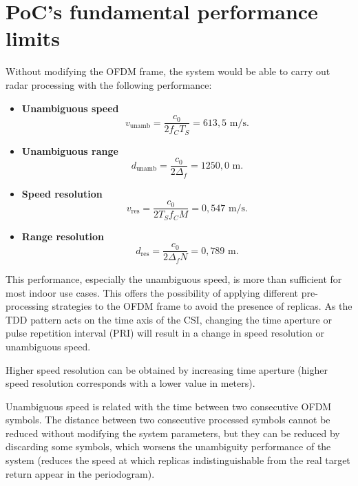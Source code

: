 \section{PoC's fundamental performance limits}

Without modifying the OFDM frame, the system would be able to carry out radar processing with the following performance:

\begin{itemize}
	\item \textbf{Unambiguous speed}
	\vspace{-\baselineskip} %
	\begin{equation}
		v_{\text{unamb}} = \frac{c_0}{2f_C T_S} = 613,5\text{ m/s}.
	\end{equation}
	
	\item \textbf{Unambiguous range}
	\begin{equation}
		d_{\text{unamb}} = \frac{c_0}{2\Delta_f} = 1250,0\text{ m}.
	\end{equation}
	\item \textbf{Speed resolution}
	\begin{equation}
		v_{\text{res}} = \frac{c_0}{2T_Sf_CM} = 0,547 \text{ m/s}.
	\end{equation} 
	\item \textbf{Range resolution}
	\begin{equation}
		d_{\text{res}} = \frac{c_0}{2\Delta_fN} = 0,789 \text{ m}.
	\end{equation}  
\end{itemize}
	
	This performance, especially the unambiguous speed, is more than sufficient for most indoor use cases. 
	This offers the possibility of applying different pre-processing strategies to the OFDM frame to avoid the presence of replicas. 
	As the TDD pattern acts on the time axis of the CSI, changing the time aperture or pulse repetition interval (PRI) will result in a change in speed resolution or unambiguous speed.
	
	Higher speed resolution can be obtained by increasing time aperture (higher speed resolution corresponds with a lower value in meters).
	
	Unambiguous speed is related with the time between two consecutive OFDM symbols. The distance between two consecutive processed symbols cannot be reduced without modifying the system parameters, but they can be reduced by discarding some symbols, which worsens the unambiguity performance of the system (reduces the speed at which replicas indistinguishable from the real target return appear in the periodogram).
	
